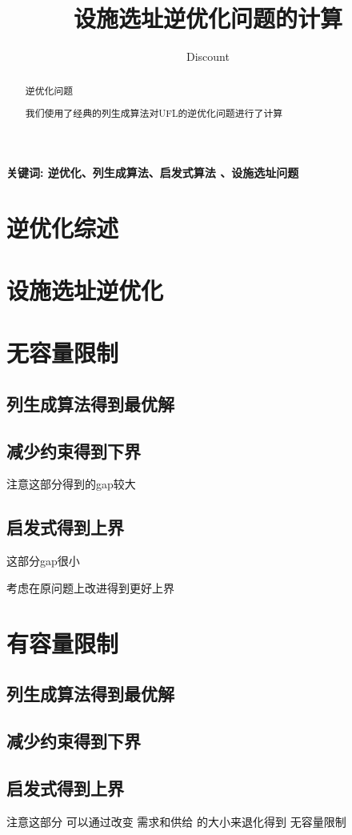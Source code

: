 \documentclass[UTF8]{article}
\author {Dis\cdot count}
\title {设施选址逆优化问题的计算}
\date{}
\begin{document}
    \maketitle

\begin{abstract}

逆优化问题

我们使用了经典的列生成算法对UFL的逆优化问题进行了计算


\end{abstract}

\qquad \textbf{关键词: 逆优化、列生成算法、启发式算法 、设施选址问题}

\section{逆优化综述}  %

\section{设施选址逆优化}

\section{无容量限制}

\subsection{列生成算法得到最优解}



\subsection{减少约束得到下界}

注意这部分得到的gap较大

\subsection{启发式得到上界}

这部分gap很小

考虑在原问题上改进得到更好上界

\section{有容量限制}

\subsection{列生成算法得到最优解}

\subsection{减少约束得到下界}


\subsection{启发式得到上界}

注意这部分 可以通过改变 需求和供给 的大小来退化得到 无容量限制
\end{document}
